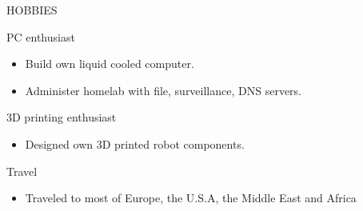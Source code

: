 \documentclass{resume}
\begin{document}
\begin{minipage}[t]{0.54\textwidth}
\begin{rsection}{\MakeUppercase{hobbies}}
		\begin{rcontent}{PC enthusiast}{}{}
			\begin{itemize}
				\item Build own liquid cooled computer.
				\item Administer homelab with file, surveillance, DNS servers.
			\end{itemize}
		\end{rcontent}
		\divider
		\begin{rcontent}{3D printing enthusiast}{}{}
			\begin{itemize}
				\item Designed own 3D printed robot components.
			\end{itemize}
		\end{rcontent}
		\divider
		\begin{rcontent}{Travel}{}{}
			\begin{itemize}
				\item Traveled to most of Europe, the U.S.A, the Middle East and Africa
			\end{itemize}
		\end{rcontent}

	\end{rsection}
\end{minipage}
\hfill
\end{document}
